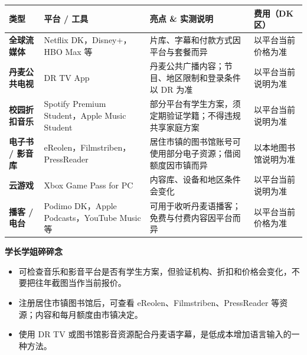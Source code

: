 \begin{table}[H]
  \scriptsize
  \centering
  \renewcommand{\arraystretch}{1.2}
  \setlength{\tabcolsep}{5pt}
  \label{tab:online-ent}
  \begin{tabularx}{\textwidth}{p{} p{} X p{}}
    \toprule
    \textbf{类型} & \textbf{平台 / 工具} & \textbf{亮点 \& 实测说明} & \textbf{费用（DK 区）} \\
    \midrule

    \textbf{全球流媒体} &
      Netflix DK，Disney+，HBO Max 等 &
      片库、字幕和付款方式因平台与套餐而异 &
      以平台当前价格为准 \\

    \textbf{丹麦公共电视} &
      DR TV App &
      丹麦公共广播内容；节目、地区限制和登录条件以 DR 为准 &
      以平台当前说明为准 \\

    \textbf{校园折扣音乐} &
      Spotify Premium Student，Apple Music Student &
      部分平台有学生方案，须定期验证学籍；不得违规共享家庭方案 &
      以平台当前说明为准 \\

    \textbf{电子书 / 影音库} &
      eReolen，Filmstriben，PressReader &
      居住市镇的图书馆账号可使用部分电子资源；借阅额度因市镇而异 &
      以本地图书馆说明为准 \\

    \textbf{云游戏} &
      Xbox Game Pass for PC &
      内容库、设备和地区条件会变化 &
      以平台当前说明为准 \\

    \textbf{播客 / 电台} &
      Podimo DK，Apple Podcasts，YouTube Music 等 &
      可用于收听丹麦语播客；免费与付费内容因平台而异 &
      以平台当前价格为准 \\
    \bottomrule
  \end{tabularx}
\end{table}

\begin{grayleftbox}
\textbf{学长学姐碎碎念}\par
\experiencenotice
\begin{itemize}
  \item 可检查音乐和影音平台是否有学生方案，但验证机构、折扣和价格会变化，不要把往年截图当作当前报价。
  \item 注册居住市镇图书馆后，可查看 eReolen、Filmstriben、PressReader 等资源；内容和每月额度由市镇决定。
  \item 使用 DR TV 或图书馆影音资源配合丹麦语字幕，是低成本增加语言输入的一种方法。
\end{itemize}
\end{grayleftbox}


